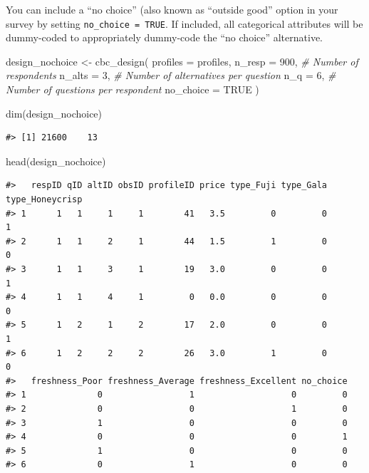 \documentclass[
  12pt,
]{article}
\newenvironment{Shaded}{\begin{snugshade}}{\end{snugshade}}
\newcommand{\AttributeTok}[1]{\textcolor[rgb]{0.77,0.63,0.00}{#1}}
\newcommand{\CommentTok}[1]{\textcolor[rgb]{0.56,0.35,0.01}{\textit{#1}}}
\newcommand{\ConstantTok}[1]{\textcolor[rgb]{0.00,0.00,0.00}{#1}}
\newcommand{\DecValTok}[1]{\textcolor[rgb]{0.00,0.00,0.81}{#1}}
\newcommand{\FunctionTok}[1]{\textcolor[rgb]{0.00,0.00,0.00}{#1}}
\newcommand{\NormalTok}[1]{#1}
\newcommand{\OtherTok}[1]{\textcolor[rgb]{0.56,0.35,0.01}{#1}}
\begin{document}
You can include a ``no choice'' (also known as ``outside good'' option
in your survey by setting \texttt{no\_choice\ =\ TRUE}. If included, all
categorical attributes will be dummy-coded to appropriately dummy-code
the ``no choice'' alternative.

\begin{Shaded}
\begin{Highlighting}[]
\NormalTok{design\_nochoice }\OtherTok{\textless{}{-}} \FunctionTok{cbc\_design}\NormalTok{(}
  \AttributeTok{profiles  =}\NormalTok{ profiles,}
  \AttributeTok{n\_resp    =} \DecValTok{900}\NormalTok{, }\CommentTok{\# Number of respondents}
  \AttributeTok{n\_alts    =} \DecValTok{3}\NormalTok{, }\CommentTok{\# Number of alternatives per question}
  \AttributeTok{n\_q       =} \DecValTok{6}\NormalTok{, }\CommentTok{\# Number of questions per respondent}
  \AttributeTok{no\_choice =} \ConstantTok{TRUE}
\NormalTok{)}

\FunctionTok{dim}\NormalTok{(design\_nochoice)}
\end{Highlighting}
\end{Shaded}

\begin{verbatim}
#> [1] 21600    13
\end{verbatim}

\begin{Shaded}
\begin{Highlighting}[]
\FunctionTok{head}\NormalTok{(design\_nochoice)}
\end{Highlighting}
\end{Shaded}

\begin{verbatim}
#>   respID qID altID obsID profileID price type_Fuji type_Gala type_Honeycrisp
#> 1      1   1     1     1        41   3.5         0         0               1
#> 2      1   1     2     1        44   1.5         1         0               0
#> 3      1   1     3     1        19   3.0         0         0               1
#> 4      1   1     4     1         0   0.0         0         0               0
#> 5      1   2     1     2        17   2.0         0         0               1
#> 6      1   2     2     2        26   3.0         1         0               0
#>   freshness_Poor freshness_Average freshness_Excellent no_choice
#> 1              0                 1                   0         0
#> 2              0                 0                   1         0
#> 3              1                 0                   0         0
#> 4              0                 0                   0         1
#> 5              1                 0                   0         0
#> 6              0                 1                   0         0
\end{verbatim}
\end{document}
